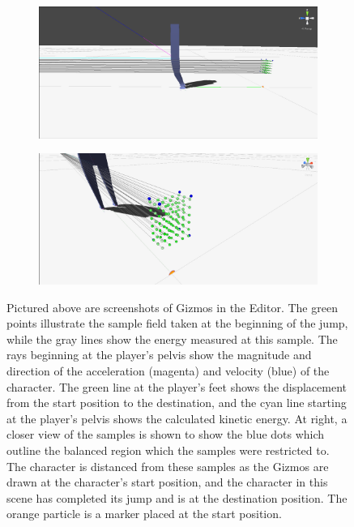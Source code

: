 \begin{figure}[ht]
	\centering
	\begin{subfigure}[b]{0.49\textwidth}
		\includegraphics[width=\textwidth]{images/gizmos1.png}
	\end{subfigure}
	\begin{subfigure}[b]{0.49\textwidth}
		\includegraphics[width=\textwidth]{images/gizmos2.png}
	\end{subfigure}
	\caption[Screenshot of Gizmos used for debug visualizations in \unity{}]{Pictured above are screenshots of Gizmos in the \unity{} Editor.  The green points illustrate the sample field taken at the beginning of the jump, while the gray lines show the energy measured at this sample.  The rays beginning at the player's pelvis show the magnitude and direction of the acceleration (magenta) and velocity (blue) of the character.  The green line at the player's feet shows the displacement from the start position to the destination, and the cyan line starting at the player's pelvis shows the calculated kinetic energy.  At right, a closer view of the samples is shown to show the blue dots which outline the balanced region which the samples were restricted to.  The character is distanced from these samples as the Gizmos are drawn at the character's start position, and the character in this scene has completed its jump and is at the destination position.  The orange particle is a marker placed at the start position.}
	\label{fig:gizmo_vis}
\end{figure}

